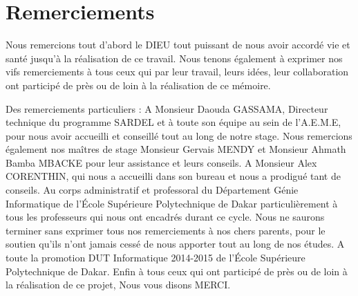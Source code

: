 %
%

\chapter*{Remerciements}

Nous remercions tout d’abord le DIEU tout puissant de nous avoir accordé vie et santé jusqu’à la réalisation de ce travail. Nous tenons également à exprimer nos vifs remerciements à tous ceux qui par leur travail, leurs idées, leur collaboration ont participé de près ou de loin à la réalisation de ce mémoire. 

Des remerciements particuliers :
A Monsieur Daouda GASSAMA, Directeur technique du programme SARDEL et à toute son équipe au sein de l’A.E.M.E, pour nous avoir accueilli et conseillé tout au long de notre stage.
Nous remercions également nos maîtres de stage Monsieur Gervais MENDY et Monsieur Ahmath Bamba MBACKE pour leur assistance et leurs conseils.
A Monsieur Alex CORENTHIN, qui nous a accueilli dans son bureau et nous a prodigué tant de conseils.
Au corps administratif et professoral du Département Génie Informatique de l’École Supérieure Polytechnique de Dakar particulièrement à tous les professeurs qui nous ont encadrés durant ce cycle.
Nous ne saurons terminer sans exprimer tous nos remerciements à nos chers parents, pour le soutien qu’ils n’ont jamais cessé de nous apporter tout au long de nos études.
A toute la promotion DUT Informatique 2014-2015 de l’École Supérieure Polytechnique de Dakar.
Enfin à tous ceux qui ont participé de près ou de loin à la réalisation de ce projet, Nous vous disons MERCI.

\clearpage